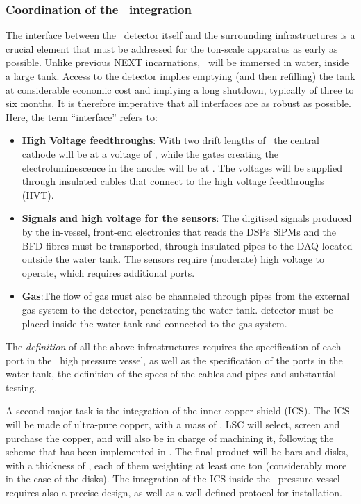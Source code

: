 \subsubsection*{Coordination of the \NHD\ integration}

The interface between the \NHD\ detector itself and the surrounding infrastructures is a crucial element that must be addressed for the ton-scale apparatus as early as possible. Unlike previous NEXT incarnations, \NHD\ will be immersed in water, inside a large tank. Access to the detector implies emptying (and then refilling) the tank at considerable economic cost and implying a long shutdown, typically of three to six  months. It is therefore imperative that all interfaces are as robust as possible. Here, the term ``interface'' refers to:

\begin{itemize}[noitemsep,topsep=0pt,parsep=0pt,partopsep=0pt]
\item {\bf High Voltage feedthroughs}:  With two drift lengths of \XHDL\ the central cathode will be at a voltage of \XHDHV, while the gates creating the electroluminescence in the anodes will be at \XHDELHV. The voltages will be supplied through insulated cables that connect to the high voltage feedthroughs (HVT). \item {\bf Signals and high voltage for the sensors}:  The digitised signals produced by the in-vessel, front-end electronics that reads the DSPs SiPMs and the BFD fibres must be transported, through insulated pipes to the DAQ located outside the water tank. The sensors require (moderate) high voltage to operate, which requires additional ports.
\item {\bf Gas}:The flow of gas must also be channeled through pipes from the external gas system to the detector, penetrating the water tank. detector must be placed inside the water tank and connected to the gas system. 
\end{itemize}

\indent

The {\em definition} of all the above infrastructures requires the specification of each port in the \NHD\ high pressure vessel, as well as the specification of the ports in the water tank, the definition of the specs of the cables and pipes and substantial testing. 
\indent

A second major task is the integration of the inner copper shield (ICS). The ICS will be made of ultra-pure copper, with a mass of \XHDS. LSC will select, screen and purchase the copper, and will also be in charge of machining it, following the scheme that has been implemented in \Next. The final product will be bars and disks, with a thickness of \XHDCS, each of them weighting at least one ton (considerably more in the case of the disks). The integration of the ICS inside the \NHD\ pressure vessel requires also a precise design, as well as a well defined protocol for installation. 

